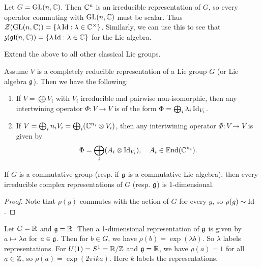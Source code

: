 \begin{example}
  Let $G = \operatorname{GL}(n, \mathbb{C})$. Then $\mathbb{C}^n$ is an
  irreducible representation of $G$, so
  every operator commuting with
  $\operatorname{GL}(n, \mathbb{C})$ must be scalar.
  Thus $\mathcal{Z}(\operatorname{GL}(n, \mathbb{C})) = \{\lambda \operatorname{Id} : \lambda \in \mathbb{C}^\times\}$.
  Similarly, we can use this to see that
  $\mathfrak{z}(\mathfrak{gl}(n, \mathbb{C})) = \{\lambda \operatorname{Id} : \lambda \in \mathbb{C}\}$
  for the Lie algebra.
\end{example}

\pagebreak
\begin{exercise}
  Extend the above to all other classical
  Lie groups.
\end{exercise}

\begin{corollary}
  Assume $V$ is a completely reducible
  representation of a Lie group $G$ (or
  Lie algebra $\mathfrak{g}$). Then we have
  the following:
  \begin{enumerate}
    \item If $V = \bigoplus V_i$ with
      $V_i$ irreducible and pairwise
      non-isomorphic, then any intertwining
      operator $\Phi : V \to V$ is of the
      form $\Phi = \bigoplus_i \lambda_i \operatorname{Id}_{V_i}$.
    \item If $V = \bigoplus_i n_i V_i = \bigoplus_i (\mathbb{C}^{n_i} \otimes V_i)$,
      then any intertwining operator
      $\Phi : V \to V$ is given by
      \[
        \Phi = \bigoplus_i (A_i \otimes \operatorname{Id}_{V_i}), \quad
        A_i \in \operatorname{End}(\mathbb{C}^{n_i}).
      \]
  \end{enumerate}
\end{corollary}

\begin{prop}
  If $G$ is a commutative group
  (resp. if $\mathfrak{g}$ is a commutative Lie algebra),
  then every irreducible complex representations
  of $G$ (resp. $\mathfrak{g}$) is 1-dimensional.
\end{prop}

\begin{proof}
  Note that
  $\rho(g)$ commutes with the action of
  $G$ for every $g$, so
  $\rho(g) \sim \operatorname{Id}$.
\end{proof}

\begin{example}
  Let $G = \mathbb{R}$ and $\mathfrak{g} = \mathbb{R}$. Then
  a 1-dimensional representation
  of $\mathfrak{g}$ is given by
  $a \mapsto \lambda a$ for
  $a \in \mathfrak{g}$. Then for $b \in G$, we have
  $\rho(b) = \exp(\lambda b)$.
  So $\lambda$ labels representations.
  For $U(1) = S^1 = \mathbb{R} / \mathbb{Z}$ and
  $\mathfrak{g} = \mathbb{R}$, we have $\rho(a) = 1$ for all
  $a \in \mathbb{Z}$, so $\rho(a) = \exp(2\pi i k a)$.
  Here $k$ labels the representations.
\end{example}

